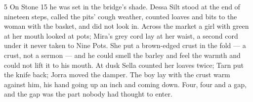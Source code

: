 \begin{CRchronicle}{5}
On Stone 15 he was set in the bridge’s shade. Dessa Silt stood at the end of nineteen steps, called the pits’ cough weather, counted loaves and bits to the woman with the basket, and did not look in. Across the market a girl with green at her mouth looked at pots; Mira’s grey cord lay at her waist, a second cord under it never taken to Nine Pots. She put a brown-edged crust in the fold --- a crust, not a sermon --- and he could smell the barley and feel the warmth and could not lift it to his mouth. At dusk Sella counted her loaves twice; Tarn put the knife back; Jorra moved the damper. The boy lay with the crust warm against him, his hand going up an inch and coming down. Four, four and a gap, and the gap was the part nobody had thought to enter.
\end{CRchronicle}
